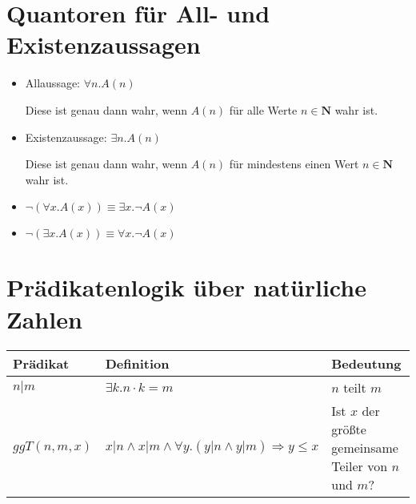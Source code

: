 \documentclass{article}
\begin{document}
\large
\section*{Quantoren für All- und Existenzaussagen}

\begin{itemize}[label=]
	\item {\Large Allaussage:}
	      $\forall n. A(n)$

	      Diese ist genau dann wahr, wenn $A(n)$ für
	      alle Werte $n \in \mathbf{N}$ wahr ist. \\

	\item {\Large Existenzaussage:}
	      $\exists n. A(n)$

	      Diese ist genau dann wahr, wenn $A(n)$ für
	      mindestens einen Wert $n \in \mathbf{N}$ wahr ist.
\end{itemize}
\begin{tcolorbox}[colback=colBack,colframe=colCornGreen,coltext=colFront, lemmaTitle=2.2]
	\begin{itemize}[label=]
		\item $\neg (\forall x. A(x)) \equiv \exists x. \neg A(x)$
		\item $\neg (\exists x. A(x)) \equiv \forall x. \neg A(x)$
	\end{itemize}
\end{tcolorbox}


\section*{Prädikatenlogik über natürliche Zahlen}
\begin{center}
	\begin{tabular}{C{3cm}|C{4cm}|L{6cm}}
		Prädikat     & Definition                                                            & Bedeutung                                             \\
		[10pt]\midrule
		$n|m$        & $\exists k. n \cdot k = m$                                            & $n$ teilt $m$                                         \\
		[10pt]
		$ggT(n,m,x)$ & $x|n \land x|m \land \forall y. (y|n \land y|m) \Rightarrow y \leq x$ & Ist $x$ der größte gemeinsame Teiler von $n$ und $m$? \\
	\end{tabular}
\end{center}
\end{document}
